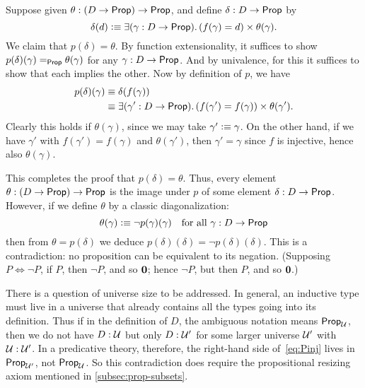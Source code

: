 Suppose given $\theta:(D\to\mathsf{Prop})\to\mathsf{Prop}$, and define $\delta:D\to\mathsf{Prop}$ by
\begin{equation}
  \delta(d) \defeq \exis{\gamma:D\to\prop} (f(\gamma) = d) \times \theta(\gamma).\label{eq:Pinj}
\end{equation}
We claim that $p(\delta)=\theta$.
By function extensionality, it suffices to show $p(\delta)(\gamma) =_\mathsf{Prop} \theta(\gamma)$ for any $\gamma:D\to\mathsf{Prop}$.
And by univalence, for this it suffices to show that each implies the other.
Now by definition of $p$, we have
\begin{align*}
  p(\delta)(\gamma) &\jdeq \delta(f(\gamma))\\
  &\jdeq \exis{\gamma':D\to\prop} (f(\gamma') = f(\gamma)) \times \theta(\gamma').
\end{align*}
Clearly this holds if $\theta(\gamma)$, since we may take $\gamma'\vcentcolon\equiv \gamma$.
On the other hand, if we have $\gamma'$ with $f(\gamma') = f(\gamma)$ and $\theta(\gamma')$, then $\gamma'=\gamma$ since $f$ is injective, hence also $\theta(\gamma)$.

This completes the proof that $p(\delta)=\theta$.
Thus, every element $\theta:(D\to\mathsf{Prop})\to\mathsf{Prop}$ is the image under $p$ of some element $\delta:D\to\mathsf{Prop}$.
However, if we define $\theta$ by a classic diagonalization:
\[ \theta(\gamma) \vcentcolon\equiv \neg p(\gamma)(\gamma) \quad\text{for all $\gamma:D\to\mathsf{Prop}$} \]
then from $\theta = p(\delta)$ we deduce $p(\delta)(\delta) = \neg p(\delta)(\delta)$.
This is a contradiction: no proposition can be equivalent to its negation.
(Supposing $P\Leftrightarrow \neg P$, if $P$, then $\neg P$, and so $\mathbf{0}$; hence $\neg P$, but then $P$, and so $\mathbf{0}$.)

\begin{rmk}
  There is a question of universe size to be addressed.
  In general, an inductive type must live in a universe that already contains all the types going into its definition.
  Thus if in the definition of $D$, the ambiguous notation \prop means $\mathsf{Prop}_{\mathcal{U}}$, then we do not have $D:\mathcal{U}$ but only $D:\mathcal{U}'$ for some larger universe $\mathcal{U}'$ with $\mathcal{U}:\mathcal{U}'$.
  In a predicative theory, therefore, the right-hand side of~\eqref{eq:Pinj} lives in $\mathsf{Prop}_{\mathcal{U}'}$, not $\mathsf{Prop}_\mathcal{U}$.
  So this contradiction does require the propositional resizing axiom
  mentioned in \autoref{subsec:prop-subsets}.
\end{rmk}

